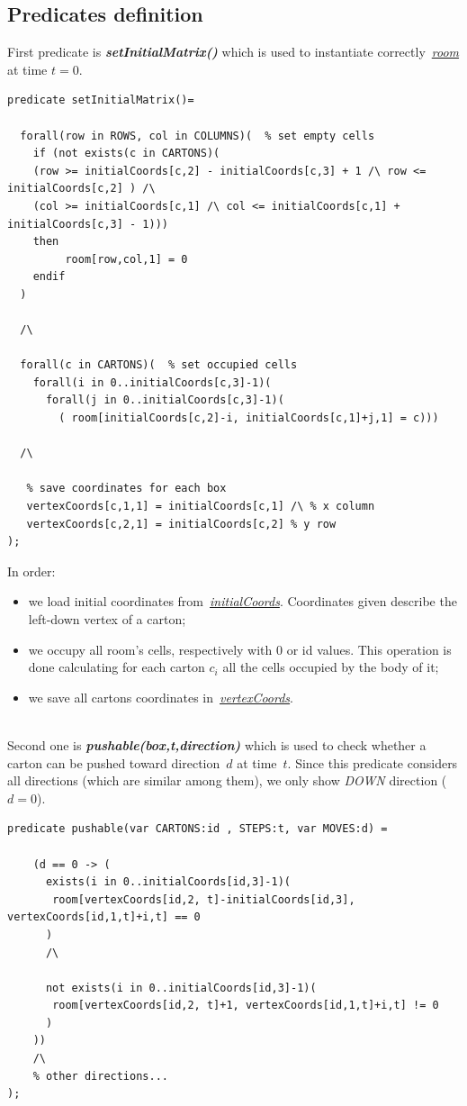 \documentclass[headinclude, footinclude, abstract=on]{scrarticle}
\begin{document}
\subsection{Predicates definition}
\label{sec:start}
First predicate is \textbf{\textit{setInitialMatrix()}} which is used to instantiate correctly~\hyperref[sec:def]{\textit{room}} at time $t = 0$.
\begin{verbatim}
predicate setInitialMatrix()=

  forall(row in ROWS, col in COLUMNS)(  % set empty cells
    if (not exists(c in CARTONS)(
    (row >= initialCoords[c,2] - initialCoords[c,3] + 1 /\ row <= initialCoords[c,2] ) /\ 
    (col >= initialCoords[c,1] /\ col <= initialCoords[c,1] + initialCoords[c,3] - 1)))
    then
         room[row,col,1] = 0
    endif
  ) 
   
  /\

  forall(c in CARTONS)(  % set occupied cells
    forall(i in 0..initialCoords[c,3]-1)(  
      forall(j in 0..initialCoords[c,3]-1)(  
        ( room[initialCoords[c,2]-i, initialCoords[c,1]+j,1] = c)))  
        
  /\
  
   % save coordinates for each box
   vertexCoords[c,1,1] = initialCoords[c,1] /\ % x column
   vertexCoords[c,2,1] = initialCoords[c,2] % y row  
);
\end{verbatim}
 In order: \begin{itemize}
    \item we load initial coordinates from~\hyperref[sec:def]{\textit{initialCoords}}. Coordinates given describe the left-down vertex of a carton; 
    \item we occupy all room's cells, respectively with 0 or id values. This operation is done calculating for each carton $c_i$ all the cells occupied by the body of it; 
    \item we save all cartons coordinates in~\hyperref[sec:def]{\textit{vertexCoords}}. 
\end{itemize}
\label{sec:pushable}
\\Second one is \textbf{\textit{pushable(box,t,direction)}} which is used to check whether a carton can be pushed toward direction~$d$ at time~$t$.
Since this predicate considers all directions (which are similar among them), we only show \textit{DOWN} direction ($d = 0$).
\begin{verbatim}
predicate pushable(var CARTONS:id , STEPS:t, var MOVES:d) =  

    (d == 0 -> (  
      exists(i in 0..initialCoords[id,3]-1)( 
       room[vertexCoords[id,2, t]-initialCoords[id,3], vertexCoords[id,1,t]+i,t] == 0
      )
      /\
      
      not exists(i in 0..initialCoords[id,3]-1)(  
       room[vertexCoords[id,2, t]+1, vertexCoords[id,1,t]+i,t] != 0
      )
    )) 
    /\ 
    % other directions...   
);
\end{verbatim}
\end{document}
